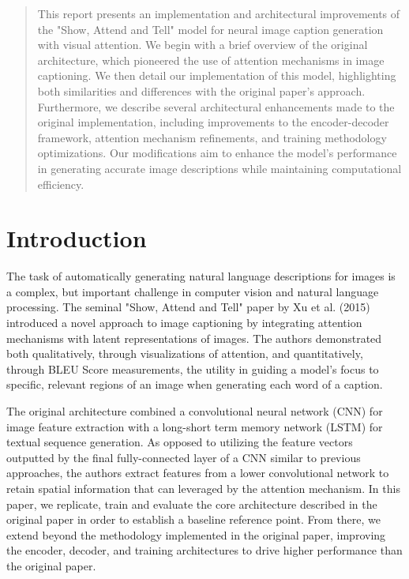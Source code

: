 \documentclass{article}
\theoremstyle{plain}
\theoremstyle{definition}
\theoremstyle{remark}
\begin{document}
\begin{abstract}
This report presents an implementation and architectural improvements of the "Show, Attend and Tell" model for neural image caption generation with visual attention. We begin with a brief overview of the original architecture, which pioneered the use of attention mechanisms in image captioning. We then detail our implementation of this model, highlighting both similarities and differences with the original paper's approach. Furthermore, we describe several architectural enhancements made to the original implementation, including improvements to the encoder-decoder framework, attention mechanism refinements, and training methodology optimizations. Our modifications aim to enhance the model's performance in generating accurate image descriptions while maintaining computational efficiency.
\end{abstract}

\section{Introduction}

The task of automatically generating natural language descriptions for images is a complex, but important challenge in computer vision and natural language processing. The seminal "Show, Attend and Tell" paper by Xu et al. (2015) introduced a novel approach to image captioning by integrating attention mechanisms with latent representations of images. The authors demonstrated both qualitatively, through visualizations of attention, and quantitatively, through BLEU Score measurements, the utility in guiding a model's focus to specific, relevant regions of an image when generating each word of a caption.

The original architecture combined a convolutional neural network (CNN) for image feature extraction with a long-short term memory network (LSTM) for textual sequence generation. As opposed to utilizing the feature vectors outputted by the final fully-connected layer of a CNN similar to previous approaches, the authors extract features from a lower convolutional network to retain spatial information that can leveraged by the attention mechanism. In this paper, we replicate, train and evaluate the core architecture described in the original paper in order to establish a baseline reference point. From there, we extend beyond the methodology implemented in the original paper, improving the encoder, decoder, and training architectures to drive higher performance than the original paper.   
\end{document}
